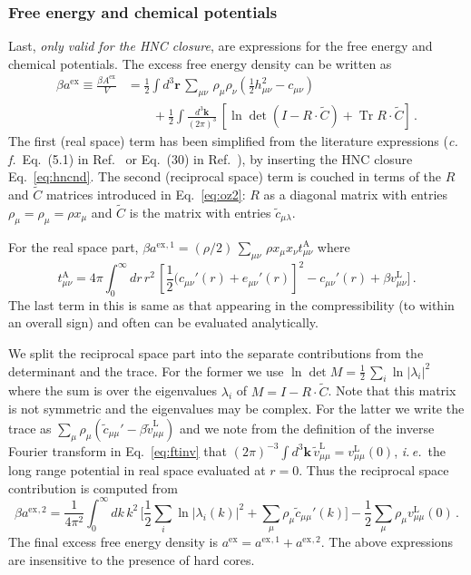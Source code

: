 \documentclass[12pt,a4paper]{article}
\DeclareMathOperator{\Tr}{Tr}
\newcommand{\latin}[1]{\emph{#1}}
\newcommand{\cf}{\latin{c.\,f.}}
\newcommand{\ie}{\latin{i.\,e.}}
\newcommand{\half}{{\textstyle\frac{1}{2}}}
\newcommand{\myex}{^{\mathrm{ex}}}
\newcommand{\Aex}{A\myex}
\newcommand{\aex}{a\myex}
\newcommand{\myvec}[1]{{\mathbf #1}}
\newcommand{\rvec}{\myvec{r}}
\newcommand{\kvec}{\myvec{k}}
\newcommand{\lr}{^{\mathrm{L}}}
\newcommand{\Eqref}[1]{Eq.~\eqref{#1}}
\newcommand{\Refcite}[1]{Ref.~\cite{#1}}
\begin{document}
\subsubsection{Free energy and chemical potentials}
%
Last, \emph{only valid for the HNC closure}, are expressions for the
free energy and chemical potentials.  The excess free energy density
can be written as
%
\begin{equation}
  \begin{split}
    \beta\aex\equiv\frac{\beta\Aex}{V}&=\frac{1}{2}\int\!d^3\rvec\,
                        {\textstyle \sum_{\mu\nu}}\,\rho_\mu \rho_\nu
                        (\half h_{\mu\nu}^2-c_{\mu\nu})\\[6pt]
         &\qquad{}+ \frac{1}{2}\int\!\frac{d^3\kvec}{(2\pi)^3}\,
         [\ln\det(I-R\cdot {\tilde C})+ \Tr R\cdot {\tilde C} ]\,.
  \end{split}
\end{equation}
%
The first (real space) term has been simplified from the literature
expressions (\cf\ Eq.~(5.1) in \Refcite{Hir60} or Eq.~(30) in
\Refcite{LB94}), by inserting the HNC closure \Eqref{eq:hncnd}.  The
second (reciprocal space) term is couched in terms of the $R$ and
$\tilde C$ matrices introduced in \Eqref{eq:oz2}: $R$ as a diagonal
matrix with entries $\rho_\mu=\rho_\mu=\rho x_\mu$ and ${\tilde C}$ is
the matrix with entries ${\tilde c}_{\mu\lambda}$.

For the real space part,
$\beta\aex{}^{,1} = (\rho/2)\, {\textstyle \sum_{\mu\nu}}\,\rho x_\mu
x_\nu t^{\mathrm{A}}_{\mu\nu}$ where
%
\begin{equation}
  t^{\mathrm{A}}_{\mu\nu}={4\pi}\int_0^\infty\!\!dr\,r^2\,
  [\half (c_{\mu\nu}'(r)+e_{\mu\nu}'(r)]^2-
  c_{\mu\nu}'(r)+\beta v_{\mu\nu}\lr]\,.
\end{equation}
%
The last term in this is same as that appearing in the compressibility
(to within an overall sign) and often can be evaluated analytically.

We split the reciprocal space part into the separate contributions
from the determinant and the trace.  For the former we use $\ln\det
M=\half\,\sum_i\ln |\lambda_i|^2$ where the sum is over the
eigenvalues $\lambda_i$ of $M=I-R\cdot{\tilde C}$.  Note that this matrix is not
symmetric and the eigenvalues may be complex.  For the latter we write
the trace as $\sum_\mu \rho_\mu ({\tilde c}_{\mu\mu}'-\beta {\tilde
  v}_{\mu\mu}\lr)$ and we note from the definition of the inverse
Fourier transform in \Eqref{eq:ftinv} that $(2\pi)^{-3}\!\int\!
d^3\kvec\, {\tilde v}_{\mu\mu}\lr=v_{\mu\mu}\lr(0)$, \ie\ the long
range potential in real space evaluated at $r=0$.  Thus 
the reciprocal space contribution is computed from
%
\begin{equation}
  \beta\aex{}^{,2}=\frac{1}{4\pi^2}\int_0^\infty\!\!dk\,k^2\,
  \bigl[\half{\textstyle\sum_i}\ln|\lambda_i(k)|^2
    + {\textstyle\sum_\mu} \rho_\mu {\tilde c}_{\mu\mu}'(k)\bigr]
  -\half{\textstyle\sum_\mu} \rho_\mu v_{\mu\mu}\lr(0)\,.
\end{equation}
%
The final excess free energy density is $\aex = \aex{}^{,1} +
\aex{}^{,2}$.  The above expressions are insensitive to the presence
of hard cores.
\end{document}
